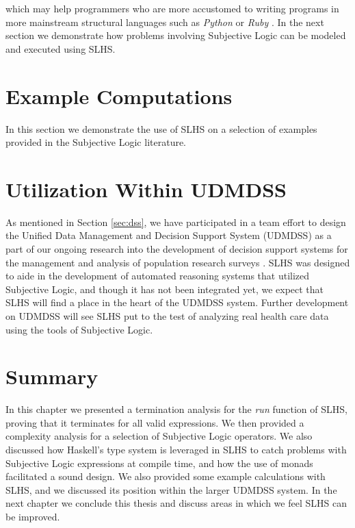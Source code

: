 \documentclass[thesis.tex]{subfiles}
\begin{document}
which may help programmers who are more accustomed to writing programs in more mainstream
structural languages such as \emph{Python} \cite{van2003python} or \emph{Ruby} \cite{matsumoto2002ruby}.
In the next section we demonstrate how
problems involving Subjective Logic can be modeled and executed using SLHS.




\section{Example Computations}

In this section we demonstrate the use of SLHS on a selection of examples provided in the
Subjective Logic literature.






\section{Utilization Within UDMDSS}

As mentioned in Section \ref{sec:dss}, we have participated in a team effort to design the
Unified Data Management and Decision Support System (UDMDSS)
as a part of our ongoing research into the development of decision support systems for
the management and analysis of population research surveys \cite{kent2010towards, kent2011design, kobti2011towards}.
SLHS was designed to aide in the
development of automated reasoning systems that utilized Subjective Logic, and though it has
not been integrated yet, we expect that SLHS will find a place in the heart of the UDMDSS
system. Further development on UDMDSS will see SLHS put to the test of analyzing real health care
data using the tools of Subjective Logic.




\section{Summary}

In this chapter we presented a termination analysis for the \emph{run} function of SLHS, proving
that it terminates for all valid expressions. We then provided a complexity analysis for a selection
of Subjective Logic operators. We also discussed how Haskell's type system is leveraged in SLHS
to catch problems with Subjective Logic expressions at compile time, and how the use of monads facilitated a sound design.
We also provided some example calculations with SLHS, and we discussed its position within the larger UDMDSS system.
In the next chapter we conclude this thesis and discuss areas in which we feel SLHS can be improved.
\end{document}
